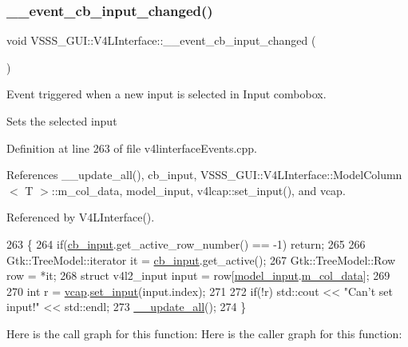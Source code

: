 \subsubsection{\texorpdfstring{\+\_\+\+\_\+event\+\_\+cb\+\_\+input\+\_\+changed()}{\_\_event\_cb\_input\_changed()}}
{\footnotesize\ttfamily void V\+S\+S\+S\+\_\+\+G\+U\+I\+::\+V4\+L\+Interface\+::\+\_\+\+\_\+event\+\_\+cb\+\_\+input\+\_\+changed (\begin{DoxyParamCaption}{ }\end{DoxyParamCaption})}



Event triggered when a new input is selected in Input combobox. 

Sets the selected input 

Definition at line 263 of file v4linterface\+Events.\+cpp.



References \+\_\+\+\_\+update\+\_\+all(), cb\+\_\+input, V\+S\+S\+S\+\_\+\+G\+U\+I\+::\+V4\+L\+Interface\+::\+Model\+Column$<$ T $>$\+::m\+\_\+col\+\_\+data, model\+\_\+input, v4lcap\+::set\+\_\+input(), and vcap.



Referenced by V4\+L\+Interface().


\begin{DoxyCode}
263                                                 \{
264         \textcolor{keywordflow}{if}(\hyperlink{class_v_s_s_s___g_u_i_1_1_v4_l_interface_af7c647eefb3e6f7cf8e0fdc170619922}{cb\_input}.get\_active\_row\_number() == -1) \textcolor{keywordflow}{return};
265 
266         Gtk::TreeModel::iterator it = \hyperlink{class_v_s_s_s___g_u_i_1_1_v4_l_interface_af7c647eefb3e6f7cf8e0fdc170619922}{cb\_input}.get\_active();
267         Gtk::TreeModel::Row row = *it;
268         \textcolor{keyword}{struct }v4l2\_input input = row[\hyperlink{class_v_s_s_s___g_u_i_1_1_v4_l_interface_ae8abf07c92a05ed82cadcabe7690e3fd}{model\_input}.\hyperlink{class_v_s_s_s___g_u_i_1_1_v4_l_interface_1_1_model_column_aa6720e1b3e47adb85d36c3ec3a2bb262}{m\_col\_data}];
269 
270         \textcolor{keywordtype}{int} r = \hyperlink{class_v_s_s_s___g_u_i_1_1_v4_l_interface_a7ece61f4ccc6d5321c445e60f34e7f33}{vcap}.\hyperlink{classv4lcap_ab3496376778bd0acacacef396fcd6387}{set\_input}(input.index);
271 
272         \textcolor{keywordflow}{if}(!r) std::cout << \textcolor{stringliteral}{"Can't set input!"} << std::endl;
273         \hyperlink{class_v_s_s_s___g_u_i_1_1_v4_l_interface_ac3fe0a20fd30c6e9505eb375ef63e52e}{\_\_update\_all}();
274     \}
\end{DoxyCode}
Here is the call graph for this function\+:
Here is the caller graph for this function\+:
\mbox{\label{class_v_s_s_s___g_u_i_1_1_v4_l_interface_adaa2a6e1946bb639d5be0ec3eb03cdb5}} 
